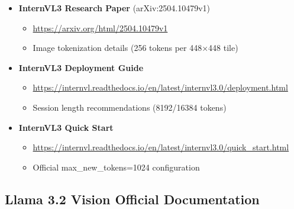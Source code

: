 \documentclass[11pt,a4paper]{article}
\begin{document}
\begin{itemize}[leftmargin=*]
    \item \textbf{InternVL3 Research Paper} (arXiv:2504.10479v1)
    \begin{itemize}
        \item \url{https://arxiv.org/html/2504.10479v1}
        \item Image tokenization details (256 tokens per 448×448 tile)
    \end{itemize}

    \item \textbf{InternVL3 Deployment Guide}
    \begin{itemize}
        \item \url{https://internvl.readthedocs.io/en/latest/internvl3.0/deployment.html}
        \item Session length recommendations (8192/16384 tokens)
    \end{itemize}

    \item \textbf{InternVL3 Quick Start}
    \begin{itemize}
        \item \url{https://internvl.readthedocs.io/en/latest/internvl3.0/quick_start.html}
        \item Official max\_new\_tokens=1024 configuration
    \end{itemize}
\end{itemize}

\subsection{Llama 3.2 Vision Official Documentation}
\end{document}
